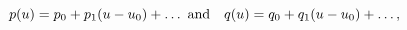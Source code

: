 \begin{equation}
p(u) = p_0 + p_1 (u-u_0) + \dots\ {\rm and}~~~
q(u) = q_0 + q_1 (u-u_0) + \dots,
\end{equation}

